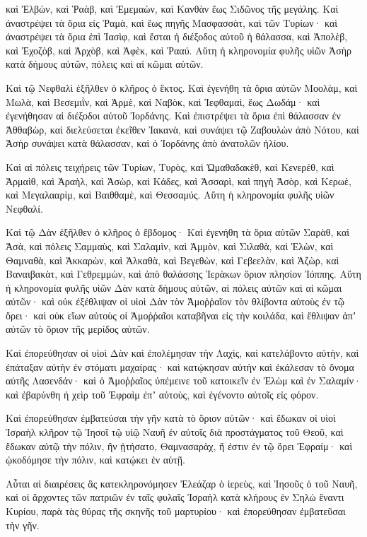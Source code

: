 {καὶ Ἐλβὼν, καὶ Ῥαὰβ, καὶ Ἐμεμαὼν, καὶ Κανθὰν ἕως Σιδῶνος τῆς μεγάλης.
Καὶ ἀναστρέψει τὰ ὅρια εἰς Ῥαμὰ, καὶ ἕως πηγῆς Μασφασσὰτ, καὶ τῶν Τυρίων· καὶ ἀναστρέψει τὰ ὅρια ἐπὶ Ἰασὶφ, καὶ ἔσται ἡ διέξοδος αὐτοῦ ἡ θάλασσα, καὶ Ἀπολὲβ, καὶ Ἐχοζὸβ,
καὶ Ἀρχὸβ, καὶ Ἀφὲκ, καὶ Ῥααύ.
Αὕτη ἡ κληρονομία φυλῆς υἱῶν Ἀσὴρ κατὰ δήμους αὐτῶν, πόλεις καὶ αἱ κῶμαι αὐτῶν.
\par }{\PP {}Καὶ τῷ Νεφθαλὶ ἐξῆλθεν ὁ κλῆρος ὁ ἕκτος.
Καὶ ἐγενήθη τὰ ὅρια αὐτῶν Μοολὰμ, καὶ Μωλὰ, καὶ Βεσεμιῒν, καὶ Ἀρμὲ, καὶ Ναβὸκ, καὶ Ἰεφθαμαὶ, ἕως Δωδάμ· καὶ ἐγενήθησαν αἱ διέξοδοι αὐτοῦ Ἰορδάνης.
Καὶ ἐπιστρέψει τὰ ὅρια ἐπὶ θάλασσαν ἐν Ἀθθαβὼρ, καὶ διελεύσεται ἐκεῖθεν Ἰακανὰ, καὶ συνάψει τῷ Ζαβουλὼν ἀπὸ Νότου, καὶ Ἀσὴρ συνάψει κατὰ θάλασσαν, καὶ ὁ Ἰορδάνης ἀπὸ ἀνατολῶν ἡλίου.
\par }{\PP {}Καὶ αἱ πόλεις τειχήρεις τῶν Τυρίων, Τυρὸς, καὶ Ὠμαθαδακὲθ, καὶ Κενερέθ,
καὶ Ἀρμαὶθ, καὶ Ἀραὴλ, καὶ Ἀσὼρ,
καὶ Κάδες, καὶ Ἀσσαρὶ, καὶ πηγὴ Ἀσὸρ,
καὶ Κερωὲ, καὶ Μεγαλααρὶμ, καὶ Βαιθθαμὲ, καὶ Θεσσαμύς.
Αὕτη ἡ κληρονομία φυλῆς υἱῶν Νεφθαλί.
\par }{\PP {}Καὶ τῷ Δὰν ἐξῆλθεν ὁ κλῆρος ὁ ἕβδομος·
Καὶ ἐγενήθη τὰ ὅρια αὐτῶν Σαρὰθ, καὶ Ἀσὰ, καὶ πόλεις Σαμμαὺς,
καὶ Σαλαμὶν, καὶ Ἀμμὸν, καὶ Σιλαθὰ,
καὶ Ἐλὼν, καὶ Θαμναθὰ, καὶ Ἀκκαρὼν,
καὶ Ἀλκαθὰ, καὶ Βεγεθὼν, καὶ Γεβεελὰν,
καὶ Ἀζὼρ, καὶ Βαναιβακὰτ, καὶ Γεθρεμμὼν,
καὶ ἀπὸ θαλάσσης Ἱερὰκων ὅριον πλησίον Ἰόππης.
Αὕτη ἡ κληρονομία φυλῆς υἱῶν Δὰν κατὰ δήμους αὐτῶν, αἱ πόλεις αὐτῶν καὶ αἱ κῶμαι αὐτῶν·
καὶ οὐκ ἐξέθλιψαν οἱ υἱοὶ Δὰν τὸν Ἀμοῤῥαῖον τὸν θλίβοντα αὐτοὺς ἐν τῷ ὄρει· καὶ οὐκ εἴων αὐτοὺς οἱ Ἀμοῥῥαῖοι καταβῆναι εἰς τὴν κοιλάδα, καὶ ἔθλιψαν ἀπʼ αὐτῶν τὸ ὅριον τῆς μερίδος αὐτῶν.
\par }{\PP {}Καὶ ἐπορεύθησαν οἱ υἱοὶ Δὰν καὶ ἐπολέμησαν τὴν Λαχὶς, καὶ κατελάβοντο αὐτὴν, καὶ ἐπάταξαν αὐτὴν ἐν στόματι μαχαίρας· καὶ κατῴκησαν αὐτὴν καὶ ἐκάλεσαν τὸ ὄνομα αὐτῆς Λασενδάν·
καὶ ὁ Ἀμοῤῥαῖος ὑπέμεινε τοῦ κατοικεῖν ἐν Ἐλὼμ καὶ ἐν Σαλαμίν· καὶ ἐβαρύνθη ἡ χεὶρ τοῦ Ἐφραὶμ ἐπʼ αὐτοὺς, καὶ ἐγένοντο αὐτοῖς εἰς φόρον.
\par }{\PP {}Καὶ ἐπορεύθησαν ἐμβατεύσαι τὴν γῆν κατὰ τὸ ὅριον αὐτῶν· καὶ ἔδωκαν οἱ υἱοὶ Ἰσραὴλ κλῆρον τῷ Ἰησοῖ τῷ υἱῷ Ναυῆ ἐν αὐτοῖς
διὰ προστάγματος τοῦ Θεοῦ, καὶ ἔδωκαν αὐτῷ τὴν πόλιν, ἣν ᾐτήσατο, Θαμνασαρὰχ, ἥ ἐστιν ἐν τῷ ὄρει Ἐφραίμ· καὶ ᾠκοδόμησε τὴν πόλιν, καὶ κατῴκει ἐν αὐτῇ.
\par }{\PP {}Αὗται αἱ διαιρέσεις ἃς κατεκληρονόμησεν Ἐλεάζαρ ὁ ἱερεὺς, καὶ Ἰησοῦς ὁ τοῦ Ναυῆ, καὶ οἱ ἄρχοντες τῶν πατριῶν ἐν ταῖς φυλαῖς Ἰσραὴλ κατὰ κλήρους ἐν Σηλὼ ἔναντι Κυρίου, παρὰ τὰς θύρας τῆς σκηνῆς τοῦ μαρτυρίου· καὶ ἐπορεύθησαν ἐμβατεῦσαι τὴν γῆν.

}
